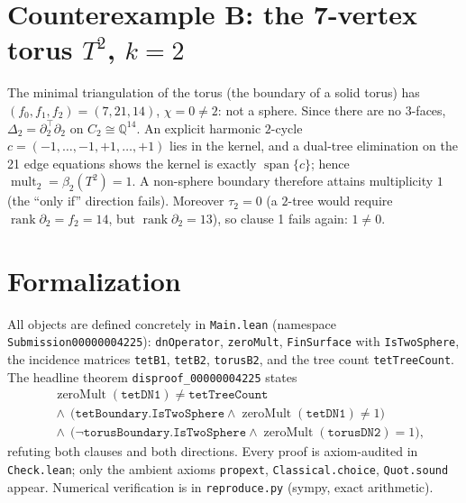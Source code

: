 \documentclass[11pt]{article}
\begin{document}
\section*{Counterexample B: the 7-vertex torus $T^2$, $k=2$}
The minimal triangulation of the torus (the boundary of a solid torus) has
$(f_0,f_1,f_2)=(7,21,14)$, $\chi=0\neq2$: not a sphere. Since there are no
$3$-faces, $\Delta_2=\partial_2^{\top}\partial_2$ on $C_2\cong\mathbb{Q}^{14}$.
An explicit harmonic $2$-cycle
$c=(-1,\dots,-1,+1,\dots,+1)$ lies in the kernel, and a dual-tree elimination
on the 21 edge equations shows the kernel is exactly $\operatorname{span}\{c\}$;
hence $\operatorname{mult}_2=\beta_2(T^2)=1$. A non-sphere boundary therefore
attains multiplicity $1$ (the ``only if'' direction fails). Moreover
$\tau_2=0$ (a $2$-tree would require $\operatorname{rank}\partial_2=f_2=14$,
but $\operatorname{rank}\partial_2=13$), so clause 1 fails again:
$1\neq0$.

\section*{Formalization}
All objects are defined concretely in \texttt{Main.lean} (namespace
\texttt{Submission00000004225}): \texttt{dnOperator},
\texttt{zeroMult}, \texttt{FinSurface} with \texttt{IsTwoSphere},
the incidence matrices \texttt{tetB1}, \texttt{tetB2}, \texttt{torusB2},
and the tree count \texttt{tetTreeCount}. The headline theorem
\texttt{disproof\_00000004225} states
\begin{align*}
&\operatorname{zeroMult}(\texttt{tetDN1})\neq\texttt{tetTreeCount}\\
&{}\wedge\ \bigl(\texttt{tetBoundary.IsTwoSphere}
   \wedge\operatorname{zeroMult}(\texttt{tetDN1})\neq1\bigr)\\
&{}\wedge\ \bigl(\neg\texttt{torusBoundary.IsTwoSphere}
   \wedge\operatorname{zeroMult}(\texttt{torusDN2})=1\bigr),
\end{align*}
refuting both clauses and both directions. Every proof is axiom-audited in
\texttt{Check.lean}; only the ambient axioms \texttt{propext},
\texttt{Classical.choice}, \texttt{Quot.sound} appear. Numerical
verification is in \texttt{reproduce.py} (sympy, exact arithmetic).
\end{document}
